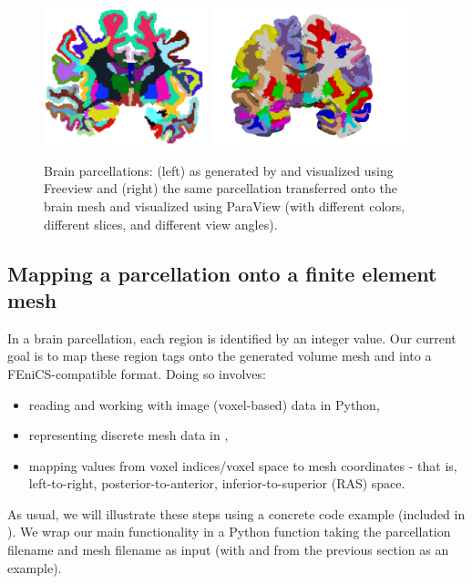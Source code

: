 \begin{figure}
\begin{center}
  \hspace{2em}
  \includegraphics[height=4cm]{./graphics/chp4/parcellation-coronalwhiteBG_2.png}
  \includegraphics[height=4cm]{./graphics/chp4/ernie32-parcellation-basic.png}
  \caption{Brain parcellations: (left) as generated by \freesurfer{} and visualized 
   using Freeview and (right) the same parcellation transferred onto the {\fenics} 
   brain mesh and visualized using ParaView (with different colors, different 
   slices, and different view angles).} 
  \label{fig:chp4:freesurfer-parc}
\end{center}
\end{figure}

\subsection{Mapping a parcellation onto a finite element mesh}
\label{sec:chp4:mapping_parcellation}
In a brain parcellation, each region is identified by an integer
value. Our current goal is to map these region tags onto the
generated volume mesh and into a FEniCS-compatible format. Doing so
involves:
\begin{itemize}
\item
  reading and working with image (voxel-based) data in Python, 
\item
  representing discrete mesh data in {\fenics},
\item
  mapping values from voxel indices/voxel space to mesh coordinates -
  that is, left-to-right, posterior-to-anterior, inferior-to-superior
  (RAS) space.
\end{itemize} 
As usual, we will illustrate these steps using a concrete code example
(included in ). We wrap our
main functionality in a Python function
 taking the parcellation
filename and mesh filename as input (with  and
 from the previous section as an example).

